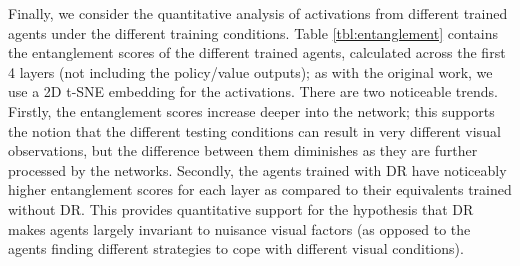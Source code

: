 \begin{table}
  \caption{Entanglement scores of different agents, for the first and second convolutional (conv.), fully-connected (FC) and LSTM layer, calculated over different testing conditions as classes (with $T = 0$). Checkmarks and crosses indicate enabling/disabling DR and proprioceptive inputs (Prop.), respectively.}
  \label{tbl:entanglement}
  \centering
\end{table}

Finally, we consider the quantitative analysis of activations from
different trained agents under the different training conditions. Table
\ref{tbl:entanglement} contains the entanglement scores
\cite{frosst2019analyzing} of the different trained agents, calculated
across the first 4 layers (not including the policy/value outputs); as
with the original work, we use a 2D t-SNE \cite{maaten2008visualizing}
embedding for the activations. There are two noticeable trends. Firstly,
the entanglement scores increase deeper into the network; this supports
the notion that the different testing conditions can result in very
different visual observations, but the difference between them
diminishes as they are further processed by the networks. Secondly, the
agents trained with DR have noticeably higher entanglement scores for
each layer as compared to their equivalents trained without DR. This
provides quantitative support for the hypothesis that DR makes agents
largely invariant to nuisance visual factors (as opposed to the agents
finding different strategies to cope with different visual conditions).

